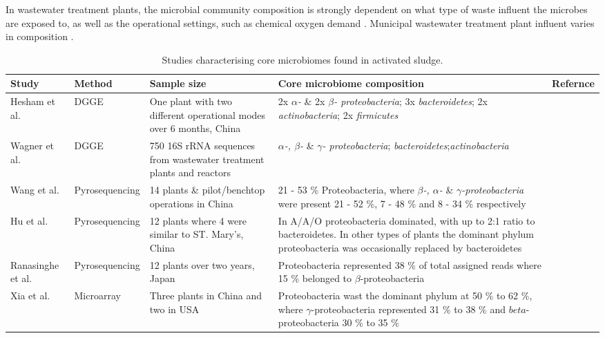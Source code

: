 \documentclass[twoside]{article}
\begin{document}
In wastewater treatment plants, the microbial community composition is strongly dependent on what type of waste influent the microbes are exposed to, as well as the operational settings, such as chemical oxygen demand \cite{Gilbride_06,wang2012pyrosequencing,hu2012microbial}. Municipal wastewater treatment plant influent varies in composition \citep{henze2002wastewater}.\\


\begin{sidewaystable}[!htbp]
\caption{Studies characterising core microbiomes found in activated sludge.}
\begin{tabular}{ | l | l | p{4.5cm} | p{7cm} | l | }
\hline
Study & Method & Sample size & Core microbiome composition & Refernce\\
\hline
Hesham et al. & DGGE & One plant with two different operational modes over 6 months, China & 2x \emph{$\alpha$-} \& 2x \emph{$\beta$- proteobacteria}; 3x \emph{bacteroidetes}; 2x \emph{actinobacteria}; 2x \emph{firmicutes} & \cite{Hesham_11} \\
\hline
Wagner et al. & DGGE & 750 16S rRNA sequences from wastewater treatment plants and reactors & \emph{$\alpha$-, $\beta$-} \& \emph{$\gamma$- proteobacteria}; \emph{bacteroidetes};\emph{actinobacteria} & \cite{Wagner_02} \\
\hline
Wang et al. & Pyrosequencing & 14 plants \& pilot/benchtop operations in China & 21 - 53 \% Proteobacteria, where \emph{$\beta$-, $\alpha$-} \& \emph{$\gamma$-proteobacteria} were present 21 - 52 \%, 7 - 48 \% and 8 - 34 \% respectively & \cite{wang2012pyrosequencing} \\
\hline
Hu et al. & Pyrosequencing & 12 plants where 4 were similar to ST. Mary's, China & In A/A/O proteobacteria dominated, with up to 2:1 ratio to bacteroidetes. In other types of plants the dominant phylum proteobacteria was occasionally replaced by bacteroidetes & \cite{hu2012microbial} \\
\hline
Ranasinghe et al. & Pyrosequencing & 12 plants over two years, Japan & Proteobacteria represented 38 \% of total assigned reads where 15 \% belonged to $\beta$-proteobacteria & \cite{ranasinghe2012revealing} \\
\hline
Xia et al. & Microarray & Three plants in China and two in USA & Proteobacteria wast the dominant phylum at 50 \% to 62 \%, where $\gamma$-proteobacteria represented  31 \% to 38 \% and $beta$-proteobacteria 30 \% to 35 \% & \cite{xia2010bacterial} \\
\hline
\end{tabular}
\end{sidewaystable}
\end{document}
